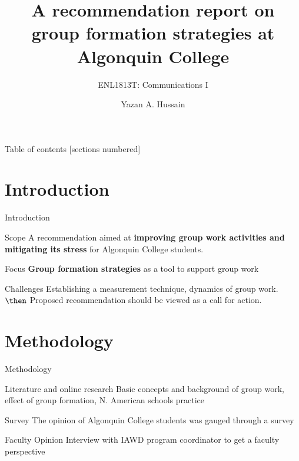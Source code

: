 \documentclass[12pt,table]{beamer}
\title{A recommendation report on group formation strategies at Algonquin College}
\subtitle{ENL1813T: Communications I}
\date{}
\author{Yazan A. Hussain}
\institute{IAWD - Algonquin College}
\begin{document}
\maketitle

\begin{frame}{Table of contents}
  [sections numbered]
  \tableofcontents[hideallsubsections]
\end{frame}

\section{Introduction}

\begin{frame}[fragile]{Introduction}
        \begin{alertblock}{Scope}
        A recommendation aimed at \textbf{improving group work activities and mitigating its stress} for Algonquin College students.
        \end{alertblock}
        \begin{alertblock}{Focus} \textbf{Group formation strategies} as a tool to support group work
        \end{alertblock}
        \begin{alertblock}{Challenges}
        Establishing a measurement technique, dynamics of group work. $\then$ Proposed recommendation should be viewed as a call for action.
    \end{alertblock}
\end{frame}
\section{Methodology}
\begin{frame}[fragile]{Methodology}
    \item
    \begin{alertblock}{Literature and online research}
    Basic concepts and background of group work, effect of group formation, N. American schools practice
    \end{alertblock}
    \begin{alertblock}{Survey}
    The opinion of Algonquin College students was gauged through a survey
    \end{alertblock}
    \begin{alertblock}{Faculty Opinion}
    Interview with IAWD program coordinator to get a faculty perspective
\end{alertblock}
\end{frame}
\end{document}
